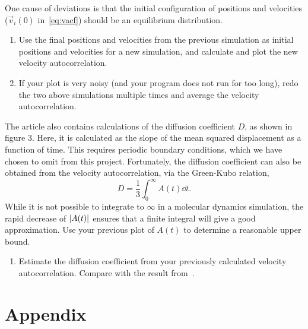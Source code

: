\documentclass[11pt,british,a4paper]{report}
\renewcommand{\thesubsection}{\arabic{section}\alph{subsection})}
\begin{document}
One cause of deviations is that the initial configuration of positions and velocities (\(\vec{v}_i(0)\) in~\vref{eq:vacf}) should be an equilibrium distribution.
\begin{enumerate}[label=\roman*.,resume]
    \item Use the final positions and velocities from the previous simulation as initial positions and velocities for a new simulation, and calculate and plot the new velocity autocorrelation.
    \item If your plot is very noisy (and your program does not run for too long), redo the two above simulations multiple times and average the velocity autocorrelation.
\end{enumerate}

The article also contains calculations of the diffusion coefficient \(D\), as shown in figure 3. Here, it is calculated as the slope of the mean squared displacement as a function of time. This requires periodic boundary conditions, which we have chosen to omit from this project. Fortunately, the diffusion coefficient can also be obtained from the velocity autocorrelation, via the Green-Kubo relation,
\[
    D = \frac{1}{3}\int_0^\infty A(t)\dd{t}.
\]
While it is not possible to integrate to \(\infty\) in a molecular dynamics simulation, the rapid decrease of \(\abs{A(t)}\) ensures that a finite integral will give a good approximation. Use your previous plot of \(A(t)\) to determine a reasonable upper bound.

\begin{enumerate}[label=\roman*.,resume]
    \item Estimate the diffusion coefficient from your previously calculated velocity autocorrelation. Compare with the result from~\cite{Rahman_1964}.
\end{enumerate}








\clearpage
\appendix
\section*{Appendix}
\setcounter{subsection}{0}
\renewcommand{\thesubsection}{\Alph{subsection}}

\end{document}
